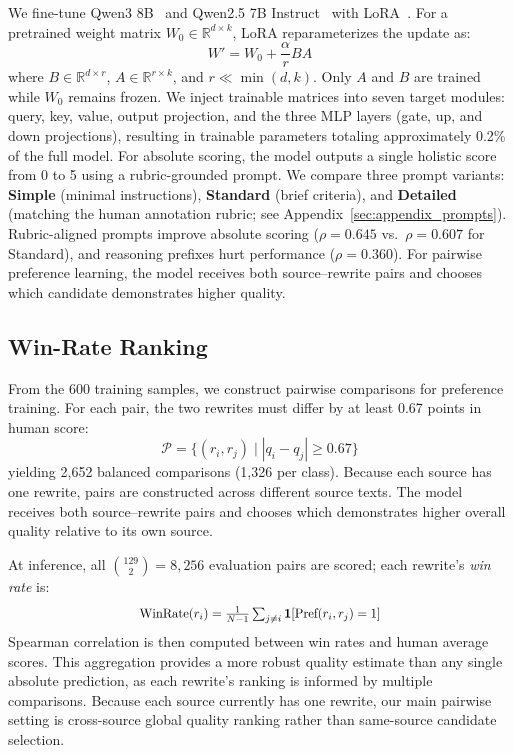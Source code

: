 \documentclass[11pt]{article}
\begin{document}
We fine-tune Qwen3 8B~\citep{yang2025qwen3} and Qwen2.5 7B Instruct~\citep{qwen2025qwen25} with LoRA~\citep{hu2022lora}.
For a pretrained weight matrix $W_0 \in \mathbb{R}^{d \times k}$, LoRA reparameterizes the update as:
\begin{equation}
W' = W_0 + \frac{\alpha}{r} BA
\label{eq:lora}
\end{equation}
where $B \in \mathbb{R}^{d \times r}$, $A \in \mathbb{R}^{r \times k}$, and $r \ll \min(d, k)$.
Only $A$ and $B$ are trained while $W_0$ remains frozen.
We inject trainable matrices into seven target modules: query, key, value, output projection, and the three MLP layers (gate, up, and down projections), resulting in trainable parameters totaling approximately 0.2\% of the full model.
For absolute scoring, the model outputs a single holistic score from 0 to 5 using a rubric-grounded prompt.
We compare three prompt variants: \textbf{Simple} (minimal instructions), \textbf{Standard} (brief criteria), and \textbf{Detailed} (matching the human annotation rubric; see Appendix~\ref{sec:appendix_prompts}).
Rubric-aligned prompts improve absolute scoring ($\rho=0.645$ vs.\ $\rho=0.607$ for Standard), and reasoning prefixes hurt performance ($\rho=0.360$).
For pairwise preference learning, the model receives both source--rewrite pairs and chooses which candidate demonstrates higher quality.




\subsection{Win-Rate Ranking}
\label{sec:winrate_section}

From the 600 training samples, we construct pairwise comparisons for preference training.
For each pair, the two rewrites must differ by at least 0.67 points in human score:
\begin{equation}
    \mathcal{P} = \{(r_i, r_j) \mid |q_i - q_j| \geq 0.67\}
    \label{eq:pairs}
\end{equation}
yielding 2,652 balanced comparisons (1,326 per class).
Because each source has one rewrite, pairs are constructed across different source texts.
The model receives both source--rewrite pairs and chooses which demonstrates higher overall quality relative to its own source.

At inference, all $\binom{129}{2}=8{,}256$ evaluation pairs are scored; each rewrite's \emph{win rate} is:
\begin{equation}
\scalebox{0.9}{$
    \text{WinRate}(r_i) = \frac{1}{N-1} \sum_{j \neq i} \mathbf{1}[\text{Pref}(r_i, r_j) = 1]
    \label{eq:winrate}
    $}
\end{equation}
Spearman correlation is then computed between win rates and human average scores.
This aggregation provides a more robust quality estimate than any single absolute prediction, as each rewrite's ranking is informed by multiple comparisons.
Because each source currently has one rewrite, our main pairwise setting is cross-source global quality ranking rather than same-source candidate selection.
\end{document}

